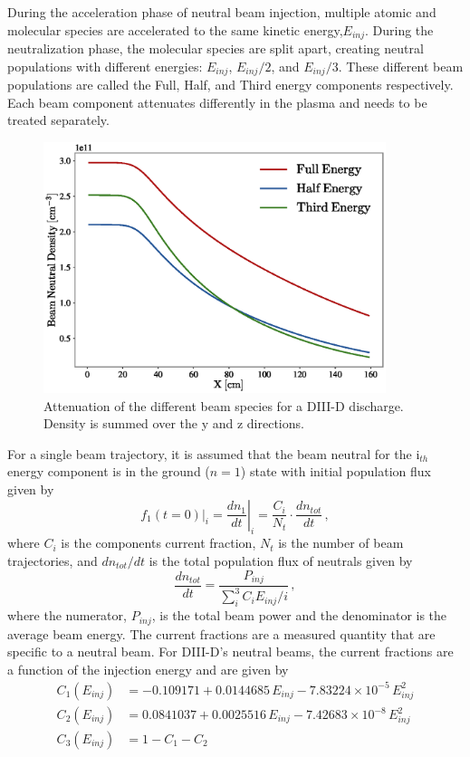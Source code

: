 During the acceleration phase of neutral beam injection, multiple atomic and molecular species are accelerated to the same kinetic energy,$E_{inj}$. During the neutralization phase, the molecular species are split apart, creating neutral populations with different energies: $E_{inj}$, $E_{inj}/2$, and $E_{inj}/3$. These different beam populations are called the Full, Half, and Third energy components respectively.
Each beam component attenuates differently in the plasma and needs to be treated separately.
\begin{figure}[h!]
    \centering
    \includegraphics[width=10cm]{figures/beam_attenuation.eps}
    \caption{Attenuation of the different beam species for a DIII-D discharge. Density is summed over the y and z directions.}
    \label{fig:beam_attenuation}
\end{figure}
For a single beam trajectory, it is assumed that the beam neutral for the i$_{th}$ energy component is in the ground ($n=1$) state with initial population flux given by
\begin{equation}\label{eq:nb_flux}
    f_1(t=0)|_i = \left. \frac{d n_1}{dt}\right\rvert_i = \frac{C_i}{N_t} \cdot \frac{d n_{tot}}{dt}\,,
\end{equation}
where $C_i$ is the components current fraction, $N_t$ is the number of beam trajectories, and $dn_{tot}/dt$ is the total population flux of neutrals given by
\begin{equation}\label{eq:tot_flux}
    \frac{d n_{tot}}{dt} = \frac{P_{inj}}{\sum_i^3 C_i E_{inj}/i}\,,
\end{equation}
where the numerator, $P_{inj}$, is the total beam power and the denominator is the average beam energy.
The current fractions are a measured quantity that are specific to a neutral beam. For DIII-D's neutral beams, the current fractions are a function of the injection energy and are given by
\begin{equation}\label{eq:d3d_cfracs}
\begin{split}
    C_{1}(E_{inj}) &= -0.109171 + 0.0144685\, E_{inj} - 7.83224\times10^{-5}\, E_{inj}^2 \\
    C_{2}(E_{inj}) &= 0.0841037 + 0.0025516\, E_{inj} - 7.42683\times10^{-8}\, E_{inj}^2 \\
    C_{3}(E_{inj}) &= 1 - C_{1} - C_{2}
\end{split}
\end{equation}

